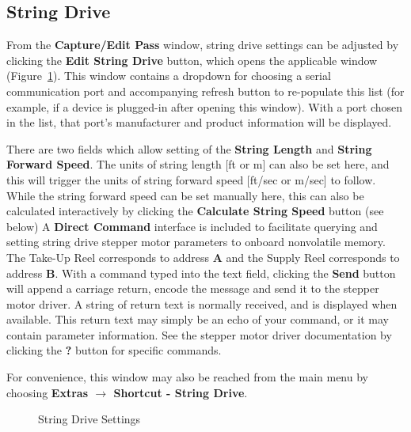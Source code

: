 \documentclass[10pt,letterpaper,titlepage]{article}
\begin{document}
    \subsection{String Drive}
    From the \textbf{Capture/Edit Pass} window, string drive settings can be adjusted by clicking the \textbf{Edit String Drive} button, which opens the applicable window (Figure~\ref{fig:string_drive_settings}). This window contains a dropdown for choosing a serial communication port and accompanying refresh button to re-populate this list (for example, if a device is plugged-in after opening this window). With a port chosen in the list, that port's manufacturer and product information will be displayed.\par
    There are two fields which allow setting of the \textbf{String Length} and \textbf{String Forward Speed}. The units of string length [ft or m] can also be set here, and this will trigger the units of string forward speed [ft/sec or m/sec] to follow. While the string forward speed can be set manually here, this can also be calculated interactively by clicking the \textbf{Calculate String Speed} button (see below) 
    A \textbf{Direct Command} interface is included to facilitate querying and setting string drive stepper motor parameters to onboard nonvolatile memory. The Take-Up Reel corresponds to address \textbf{A} and the Supply Reel corresponds to address \textbf{B}. With a command typed into the text field, clicking the \textbf{Send} button will append a carriage return, encode the message and send it to the stepper motor driver. A string of return text is normally received, and is displayed when available. This return text may simply be an echo of your command, or it may contain parameter information. See the stepper motor driver documentation by clicking the \textbf{?} button for specific commands.\par
    For convenience, this window may also be reached from the main menu by choosing \textbf{Extras $\rightarrow$ Shortcut - String Drive}.
    \begin{figure}[hb]
        \centering
        \caption{String Drive Settings}
        \label{fig:string_drive_settings}
    \end{figure}
    \newpage
    
\end{document}
